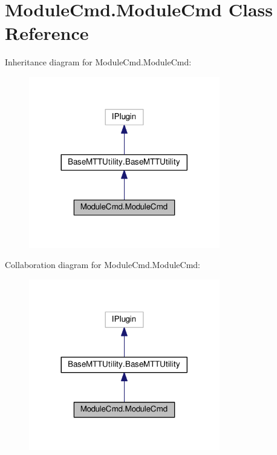 \hypertarget{class_module_cmd_1_1_module_cmd}{\section{Module\-Cmd.\-Module\-Cmd Class Reference}
\label{class_module_cmd_1_1_module_cmd}
}


Inheritance diagram for Module\-Cmd.\-Module\-Cmd\-:
\nopagebreak
\begin{figure}[H]
\begin{center}
\leavevmode
\includegraphics[width=236pt]{class_module_cmd_1_1_module_cmd__inherit__graph}
\end{center}
\end{figure}


Collaboration diagram for Module\-Cmd.\-Module\-Cmd\-:
\nopagebreak
\begin{figure}[H]
\begin{center}
\leavevmode
\includegraphics[width=236pt]{class_module_cmd_1_1_module_cmd__coll__graph}
\end{center}
\end{figure}
